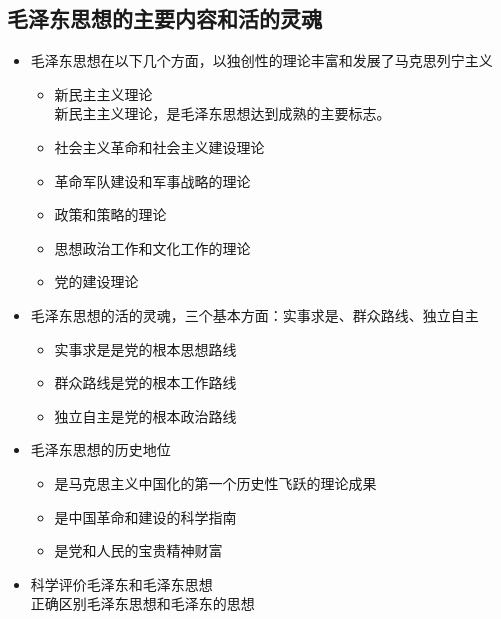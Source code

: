 \subsection{毛泽东思想的主要内容和活的灵魂}
\begin{itemize}
	\item 毛泽东思想在以下几个方面，以独创性的理论丰富和发展了马克思列宁主义
	\begin{itemize}
	\item 新民主主义理论\\
	新民主主义理论，是毛泽东思想达到成熟的主要标志。
	\item 社会主义革命和社会主义建设理论 
	\item 革命军队建设和军事战略的理论
	\item 政策和策略的理论
	\item 思想政治工作和文化工作的理论
	\item 党的建设理论
	\end{itemize}
	\item 毛泽东思想的活的灵魂，三个基本方面：实事求是、群众路线、独立自主
	\begin{itemize}
		\item 实事求是是党的根本思想路线
		\item 群众路线是党的根本工作路线
		\item 独立自主是党的根本政治路线
	\end{itemize}
	\item 毛泽东思想的历史地位
	\begin{itemize}
		\item 是马克思主义中国化的第一个历史性飞跃的理论成果
		\item 是中国革命和建设的科学指南
		\item 是党和人民的宝贵精神财富
		
	\end{itemize}
		\item 科学评价毛泽东和毛泽东思想\\
		正确区别毛泽东思想和毛泽东的思想
\end{itemize}



